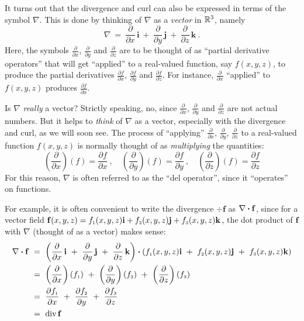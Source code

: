 It turns out that the divergence and curl can also be expressed in terms of the symbol $\nabla$. This is done by
thinking of $\nabla$ as a \emph{vector} in $\mathbb{R}^{3}$, namely\index{$\nabla$}
\begin{equation}\label{eqn:del}
 \nabla ~=~ \frac{\partial}{\partial x}\,\mathbf{i} ~+~ \frac{\partial}{\partial y}\,\mathbf{j} ~+~
   \frac{\partial}{\partial z}\,\mathbf{k} ~.
\end{equation}
Here, the symbols $\frac{\partial}{\partial x}$, $ \frac{\partial}{\partial y}$ and $\frac{\partial}{\partial z}$ are to
be thought of as ``partial derivative operators'' that will get ``applied'' to a real-valued function, say $f(x,y,z)$,
to produce the partial derivatives $\frac{\partial f}{\partial x}$, $\frac{\partial f}{\partial y}$ and
$\frac{\partial f}{\partial z}$. For instance, $\frac{\partial}{\partial x}$ ``applied'' to $f(x,y,z)$ produces
$\frac{\partial f}{\partial x}$.

Is $\nabla$ \emph{really} a vector? Strictly speaking, no, since $\frac{\partial}{\partial x}$,
$\frac{\partial}{\partial y}$ and $\frac{\partial}{\partial z}$ are not actual numbers. 
But it helps to
\emph{think} of $\nabla$ as a vector, especially with the divergence and curl, as we will soon see. 
The process of
``applying'' $\frac{\partial}{\partial x}$, $\frac{\partial}{\partial y}$, $\frac{\partial}{\partial z}$ to a
real-valued function $f(x,y,z)$ is normally thought of as \emph{multiplying} the quantities:
\begin{displaymath}
 \left( \frac{\partial}{\partial x} \right) (f) = \frac{\partial f}{\partial x} ~,\quad
 \left( \frac{\partial}{\partial y} \right) (f) = \frac{\partial f}{\partial y} ~,\quad
 \left( \frac{\partial}{\partial z} \right) (f) = \frac{\partial f}{\partial z}
\end{displaymath}
For this reason, $\nabla$ is often referred to as the ``del operator'', since it ``operates'' on functions.
 
For example, it is often convenient to write the divergence $\div\mathbf{f}$ as $\nabla \bm{\cdot} \mathbf{f}$,
since for a vector field $\mathbf{f}(x,y,z) =
f_{\scriptscriptstyle 1}(x,y,z)\mathbf{i} + f_{\scriptscriptstyle 2}(x,y,z) \mathbf{j} + f_{\scriptscriptstyle 3}(x,y,z) \mathbf{k}$, the dot product of
$\mathbf{f}$ with $\nabla$ (thought of as a vector) makes sense:
\begin{align*}
 \nabla \bm{\cdot} \mathbf{f} ~&=~ \left( \frac{\partial}{\partial x}\,\mathbf{i} ~+~
  \frac{\partial}{\partial y}\,\mathbf{j} ~+~ \frac{\partial}{\partial z}\,\mathbf{k} \right)  \bm{\cdot} \left( f_{\scriptscriptstyle 1}(x,y,z)
  \mathbf{i} ~+~ f_{\scriptscriptstyle 2}(x,y,z) \mathbf{j} ~+~ f_{\scriptscriptstyle 3}(x,y,z) \mathbf{k} \right)\\
   &=~ \left( \frac{\partial}{\partial x} \right) (f_{\scriptscriptstyle 1}) ~+~
    \left( \frac{\partial}{\partial y} \right) (f_{\scriptscriptstyle 2}) ~+~
    \left( \frac{\partial}{\partial z} \right) (f_{\scriptscriptstyle 3})\\
   &=~ \frac{\partial f_{\scriptscriptstyle 1}}{\partial x} ~+~ \frac{\partial f_{\scriptscriptstyle 2}}{\partial y} ~+~
  \frac{\partial f_{\scriptscriptstyle 3}}{\partial z}\\
   &=~ \mathop{\mathrm{div}}\nolimits\mathbf{f}
\end{align*}

